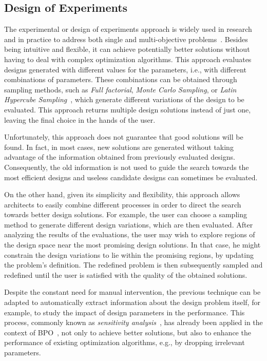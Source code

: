 	\subsection{Design of Experiments}
	\label{ssec:doe}
	
	The experimental or design of experiments approach is widely used in research and in practice to address both single and multi-objective problems~\cite{Fang2017}. Besides being intuitive and flexible, it can achieve potentially better solutions without having to deal with complex optimization algorithms. This approach evaluates designs generated with different values for the parameters, i.e., with different combinations of parameters. These combinations can be obtained through sampling methods, such as \textit{Full factorial}, \textit{Monte Carlo Sampling}, or \textit{Latin Hypercube Sampling}~\cite{Giunta2003DOE}, which generate different variations of the design to be evaluated. This approach returns multiple design solutions instead of just one, leaving the final choice in the hands of the user.
	
	Unfortunately, this approach does not guarantee that good solutions will be found. In fact, in most cases, new solutions are generated without taking advantage of the information obtained from previously evaluated designs. Consequently, the old information is not used to guide the search towards the most efficient designs and useless candidate designs can sometimes be evaluated. 
	
	On the other hand, given its simplicity and flexibility, this approach allows architects to easily combine different processes in order to direct the search towards better design solutions. For example, the user can choose a sampling method to generate different design variations, which are then evaluated. After analyzing the results of the evaluations, the user may wish to explore regions of the design space near the most promising design solutions. In that case, he might constrain the design variations to lie within the promising regions, by updating the problem’s definition. The redefined problem is then subsequently sampled and redefined until the user is satisfied with the quality of the obtained solutions.
	
	Despite the constant need for manual intervention, the previous technique can be adapted to automatically extract information about the design problem itself, for example, to study the impact of design parameters in the performance. This process, commonly known as \textit{sensitivity analysis}~\cite{Saltelli2007}, has already been applied in the context of \ac{BPO}~\cite{Tian2013}, not only to achieve better solutions, but also to enhance the performance of existing optimization algorithms, e.g., by dropping irrelevant parameters.
	
